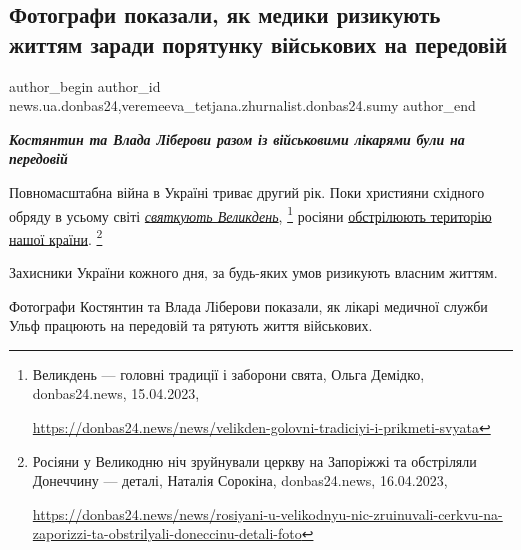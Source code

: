  
 
 
 
 
 
\subsection{Фотографи показали, як медики ризикують життям заради порятунку військових на передовій}
\label{sec:17_04_2023.stz.news.ua.donbas24.1.fotografy_medyky_porjatunok_vijskovyh_peredova}
 
\ifcmt
 author_begin
   author_id news.ua.donbas24,veremeeva_tetjana.zhurnalist.donbas24.sumy
 author_end
\fi

\begin{center}
  \em\bfseries\Large
Костянтин та Влада Ліберови разом із військовими лікарями були на передовій
\end{center}

Повномасштабна війна в Україні триває другий рік. Поки християни східного
обряду в усьому світі \href{https://donbas24.news/news/velikden-golovni-tradiciyi-i-prikmeti-svyata}{\emph{святкують Великдень}},%
\footnote{Великдень — головні традиції і заборони свята, Ольга Демідко, donbas24.news, 15.04.2023, \par\url{https://donbas24.news/news/velikden-golovni-tradiciyi-i-prikmeti-svyata}}
росіяни \href{https://donbas24.news/news/rosiyani-u-velikodnyu-nic-zruinuvali-cerkvu-na-zaporizzi-ta-obstrilyali-doneccinu-detali-foto}{обстрілюють територію нашої країни}.%
\footnote{Росіяни у Великодню ніч зруйнували церкву на Запоріжжі та обстріляли Донеччину — деталі, Наталія Сорокіна, donbas24.news, 16.04.2023, \par\url{https://donbas24.news/news/rosiyani-u-velikodnyu-nic-zruinuvali-cerkvu-na-zaporizzi-ta-obstrilyali-doneccinu-detali-foto}}

Захисники України кожного дня, за будь-яких умов ризикують власним життям.

Фотографи Костянтин та Влада Ліберови показали, як лікарі медичної служби Ульф
працюють на передовій та рятують життя військових.
